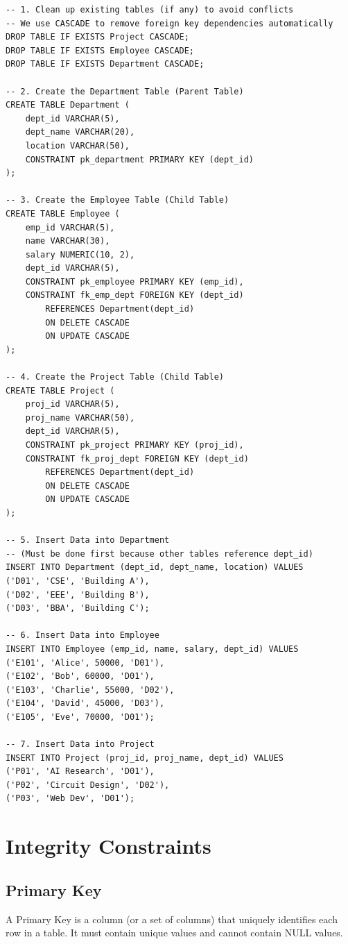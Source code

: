 \documentclass[12pt,a4paper]{article}
\begin{document}
\begin{lstlisting}
-- 1. Clean up existing tables (if any) to avoid conflicts
-- We use CASCADE to remove foreign key dependencies automatically
DROP TABLE IF EXISTS Project CASCADE;
DROP TABLE IF EXISTS Employee CASCADE;
DROP TABLE IF EXISTS Department CASCADE;

-- 2. Create the Department Table (Parent Table)
CREATE TABLE Department (
    dept_id VARCHAR(5),
    dept_name VARCHAR(20),
    location VARCHAR(50),
    CONSTRAINT pk_department PRIMARY KEY (dept_id)
);

-- 3. Create the Employee Table (Child Table)
CREATE TABLE Employee (
    emp_id VARCHAR(5),
    name VARCHAR(30),
    salary NUMERIC(10, 2),
    dept_id VARCHAR(5),
    CONSTRAINT pk_employee PRIMARY KEY (emp_id),
    CONSTRAINT fk_emp_dept FOREIGN KEY (dept_id) 
        REFERENCES Department(dept_id) 
        ON DELETE CASCADE 
        ON UPDATE CASCADE
);

-- 4. Create the Project Table (Child Table)
CREATE TABLE Project (
    proj_id VARCHAR(5),
    proj_name VARCHAR(50),
    dept_id VARCHAR(5),
    CONSTRAINT pk_project PRIMARY KEY (proj_id),
    CONSTRAINT fk_proj_dept FOREIGN KEY (dept_id)
        REFERENCES Department(dept_id)
        ON DELETE CASCADE
        ON UPDATE CASCADE
);

-- 5. Insert Data into Department
-- (Must be done first because other tables reference dept_id)
INSERT INTO Department (dept_id, dept_name, location) VALUES
('D01', 'CSE', 'Building A'),
('D02', 'EEE', 'Building B'),
('D03', 'BBA', 'Building C');

-- 6. Insert Data into Employee
INSERT INTO Employee (emp_id, name, salary, dept_id) VALUES
('E101', 'Alice', 50000, 'D01'),
('E102', 'Bob', 60000, 'D01'),
('E103', 'Charlie', 55000, 'D02'),
('E104', 'David', 45000, 'D03'),
('E105', 'Eve', 70000, 'D01');

-- 7. Insert Data into Project
INSERT INTO Project (proj_id, proj_name, dept_id) VALUES
('P01', 'AI Research', 'D01'),
('P02', 'Circuit Design', 'D02'),
('P03', 'Web Dev', 'D01');
\end{lstlisting}
\section{Integrity Constraints}

\subsection{Primary Key}
A Primary Key is a column (or a set of columns) that uniquely identifies each row in a table. It must contain unique values and cannot contain NULL values.
\end{document}
